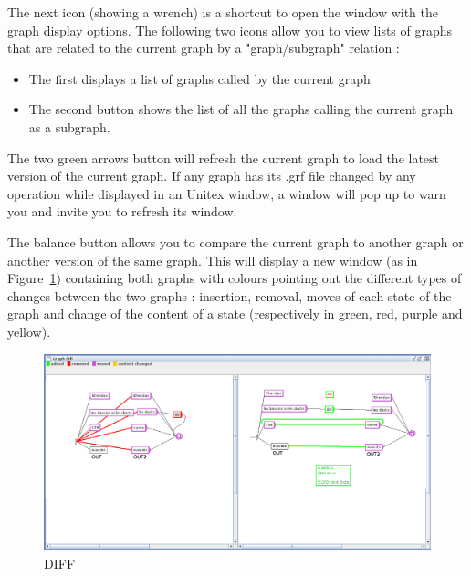 \bigskip
\noindent The next icon (showing a wrench) is a shortcut to open the window with the graph display
options.
The following two icons allow you to view lists of graphs that are related to the current graph by a  "graph/subgraph" relation :
\begin{itemize}
\item The first displays a list of graphs called by the current graph
\item The second button shows the list of all the graphs calling the current graph as a subgraph.
\end{itemize}
The two green arrows button will refresh the current graph to load the latest version of the current graph. If any graph has its .grf file changed by any operation while displayed in an Unitex window, a window will pop up to warn you and invite you to refresh its window.

\bigskip
\noindent The balance button allows you to compare the current graph to another graph or another version of the same graph. This will display a new window (as in Figure~\ref{Graph-DIFF}) containing both graphs with colours pointing out the different types of changes between the two graphs : insertion, removal, moves of each state of the graph and change of the content of a state (respectively in green, red, purple and yellow).

\bigskip
\noindent 
\begin{figure}[!h]
\begin{center}
\includegraphics[width=15.6cm]{resources/img/DIFF.png}
\caption{DIFF\label{Graph-DIFF}}
\end{center}
\end{figure}
\bigskip
\noindent 

